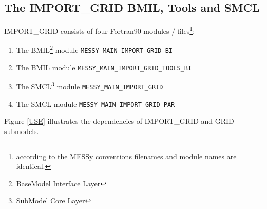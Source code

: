 \documentclass[11pt,twoside]{report}
\begin{document}
\subsection{The IMPORT\_GRID BMIL, Tools and SMCL \label{IGToolsandCore}}
IMPORT\_GRID consists of four Fortran90 modules /
files\footnote{according to the MESSy conventions filenames and module
names are identical.}: 
\begin{enumerate}
\item The BMIL\footnote{BaseModel Interface Layer} module \verb|MESSY_MAIN_IMPORT_GRID_BI|
\item The BMIL module \verb|MESSY_MAIN_IMPORT_GRID_TOOLS_BI|
\item The SMCL\footnote{SubModel Core Layer} module \verb|MESSY_MAIN_IMPORT_GRID|
\item The SMCL module \verb|MESSY_MAIN_IMPORT_GRID_PAR|
\end{enumerate}
Figure \ref{USE} illustrates the dependencies of IMPORT\_GRID and
GRID submodels.
\end{document}
